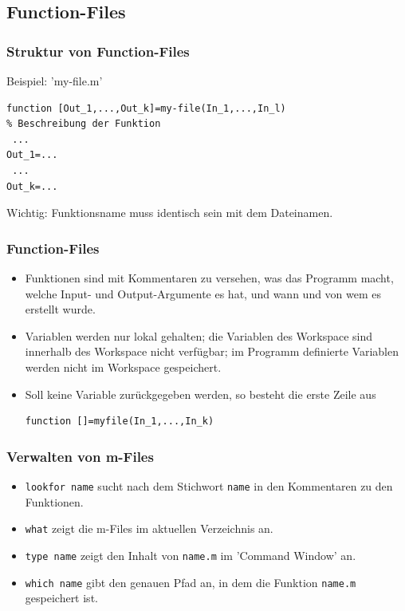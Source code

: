 \subsection{Function-Files}
\begin{frame}[fragile]\frametitle{Struktur von Function-Files}
Beispiel: 'my-file.m'
\begin{lstlisting}
function [Out_1,...,Out_k]=my-file(In_1,...,In_l)
% Beschreibung der Funktion
 ...
Out_1=...
 ...
Out_k=...
\end{lstlisting}
\alert{Wichtig:} Funktionsname muss identisch sein mit dem Dateinamen.
\end{frame}
\begin{frame}[fragile]\frametitle{Function-Files}
\begin{itemize}
\item Funktionen sind mit Kommentaren zu versehen, was das Programm
  macht, welche Input- und Output-Argumente es hat, und wann und von
  wem es erstellt wurde.
\item Variablen werden nur lokal gehalten; die Variablen des Workspace
  sind innerhalb des Workspace nicht verfügbar; im Programm definierte Variablen werden nicht im
  Workspace gespeichert.
\item Soll keine Variable zurückgegeben werden, so besteht die erste
  Zeile aus
\begin{lstlisting}
function []=myfile(In_1,...,In_k)
\end{lstlisting}
\end{itemize}
\end{frame}
\begin{frame}[fragile]\frametitle{Verwalten von m-Files}
\begin{itemize}
\item \alert{ \lstinline!lookfor name!} sucht nach dem Stichwort \lstinline!name! in den
  Kommentaren zu den Funktionen.
\item  \alert{ \lstinline!what!} zeigt die m-Files im aktuellen Verzeichnis an.
\item  \alert{ \lstinline!type name!} zeigt den Inhalt von \lstinline!name.m! im 'Command
  Window' an.
\item  \alert{ \lstinline!which name!} gibt den genauen Pfad an, in dem die  Funktion
  \lstinline!name.m! gespeichert ist. 
\end{itemize}
\end{frame}
